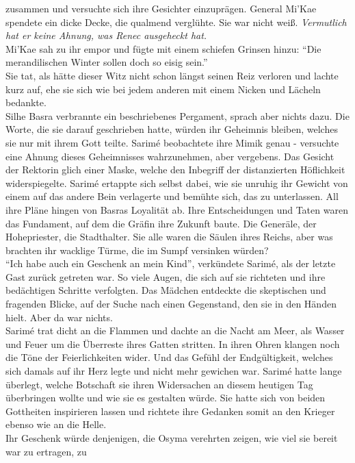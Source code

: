 zusammen und versuchte sich ihre Gesichter einzuprägen. General Mi'Kae spendete ein dicke Decke, 
die qualmend verglühte. Sie war nicht weiß. \textit{Vermutlich hat er keine Ahnung, was Renec 
ausgeheckt hat.}\\
Mi'Kae sah zu ihr empor und fügte mit einem schiefen Grinsen hinzu: ``Die merandilischen Winter 
sollen doch so eisig sein.''\\
Sie tat, als hätte dieser Witz nicht schon längst seinen Reiz verloren und lachte kurz auf, ehe sie 
sich wie bei jedem anderen mit einem Nicken und Lächeln bedankte.\\
Silhe Basra verbrannte ein beschriebenes Pergament, sprach aber nichts dazu. Die Worte, die sie 
darauf geschrieben hatte, würden ihr Geheimnis bleiben, welches sie nur mit ihrem Gott teilte. 
Sarimé beobachtete ihre Mimik genau - versuchte eine Ahnung dieses Geheimnisses wahrzunehmen, aber 
vergebens. Das Gesicht der Rektorin glich einer Maske, welche den Inbegriff der distanzierten 
Höflichkeit widerspiegelte. Sarimé ertappte sich selbst dabei, wie sie unruhig ihr Gewicht von 
einem auf das andere Bein verlagerte und bemühte sich, das zu unterlassen. All ihre Pläne hingen 
von Basras Loyalität ab. Ihre Entscheidungen und Taten waren das Fundament, auf dem die Gräfin ihre 
Zukunft baute. Die Generäle, der Hohepriester, die Stadthalter. Sie alle waren die Säulen ihres 
Reichs, aber was brachten ihr wacklige Türme, die im Sumpf versinken würden?\\
``Ich habe auch ein Geschenk an mein Kind'', verkündete Sarimé, als der letzte Gast zurück getreten 
war. So viele Augen, die sich auf sie richteten und ihre bedächtigen Schritte verfolgten. Das 
Mädchen entdeckte die skeptischen und fragenden Blicke, auf der Suche nach einen Gegenstand, den 
sie in den Händen hielt. Aber da war nichts.\\
Sarimé trat dicht an die Flammen und dachte an die Nacht am Meer, als Wasser und Feuer um die 
Überreste ihres Gatten stritten. In ihren Ohren klangen noch die Töne der Feierlichkeiten wider. 
Und das Gefühl der Endgültigkeit, welches sich damals auf ihr Herz legte und nicht mehr gewichen 
war. Sarimé hatte lange überlegt, welche Botschaft sie ihren Widersachen an diesem heutigen Tag 
überbringen wollte und wie sie es gestalten würde. Sie hatte sich von beiden Gottheiten inspirieren 
lassen und richtete ihre Gedanken somit an den Krieger ebenso wie an die Helle.\\
Ihr Geschenk würde denjenigen, die Osyma verehrten zeigen, wie viel sie bereit war zu ertragen, zu 
